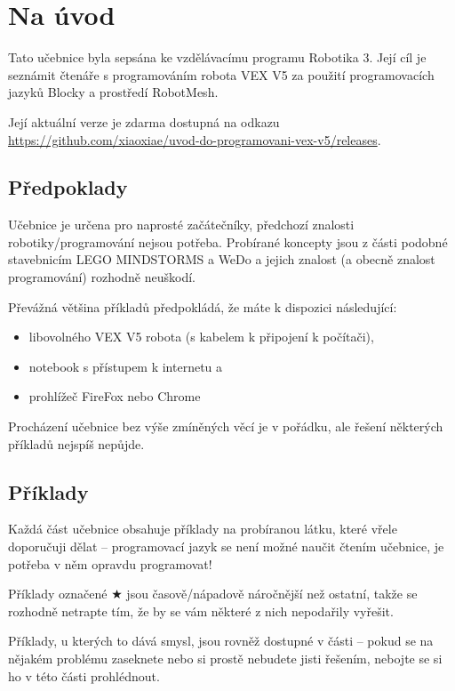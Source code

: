 \tableofcontents
\cleardoublepage

\setcounter{secnumdepth}{0}
\section{Na úvod}
Tato učebnice byla sepsána ke vzdělávacímu programu Robotika 3. Její cíl je seznámit čtenáře s programováním robota VEX V5 za použití programovacích jazyků Blocky a prostředí RobotMesh.

Její aktuální verze je zdarma dostupná na odkazu \href{https://github.com/xiaoxiae/uvod-do-programovani-vex-v5/releases}{https://github.com/xiaoxiae/uvod-do-programovani-vex-v5/releases}.

\subsection{Předpoklady}
Učebnice je určena pro naprosté začátečníky, předchozí znalosti robotiky/programování nejsou potřeba. Probírané koncepty jsou z části podobné stavebnicím LEGO MINDSTORMS a WeDo a jejich znalost (a obecně znalost programování) rozhodně neuškodí.

Převážná většina příkladů předpokládá, že máte k dispozici následující:
\begin{itemize}
	\item libovolného VEX V5 robota (s kabelem k připojení k počítači),
	\item notebook s přístupem k internetu a
	\item prohlížeč FireFox nebo Chrome
\end{itemize}

Procházení učebnice bez výše zmíněných věcí je v pořádku, ale řešení některých příkladů nejspíš nepůjde.

\subsection{Příklady}
Každá část učebnice obsahuje příklady na probíranou látku, které vřele doporučuji dělat -- programovací jazyk se není možné naučit čtením učebnice, je potřeba v něm opravdu programovat!

Příklady označené $\bigstar$ jsou časově/nápadově náročnější než ostatní, takže se rozhodně netrapte tím, že by se vám některé z nich nepodařily vyřešit.

Příklady, u kterých to dává smysl, jsou rovněž dostupné v části  -- pokud se na nějakém problému zaseknete nebo si prostě nebudete jisti řešením, nebojte se si ho v této části prohlédnout.

